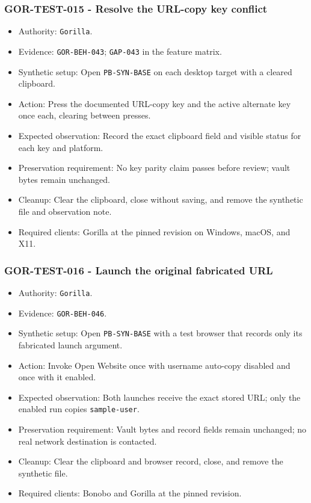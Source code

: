 \documentclass[
  letterpaper,
]{article}
\newcommand{\passthrough}[1]{#1}
\providecommand{\tightlist}{%
  \setlength{\itemsep}{0pt}\setlength{\parskip}{0pt}}
\begin{document}
\subsubsection{GOR-TEST-015 - Resolve the URL-copy key conflict}\label{gor-test-015---resolve-the-url-copy-key-conflict}

\begin{itemize}
\tightlist
\item
  Authority: \passthrough{\lstinline!Gorilla!}.
\item
  Evidence: \nolinkurl{GOR-BEH-043}; \passthrough{\lstinline!GAP-043!} in the feature matrix.
\item
  Synthetic setup: Open \nolinkurl{PB-SYN-BASE} on each desktop target with a cleared clipboard.
\item
  Action: Press the documented URL-copy key and the active alternate key once each, clearing between presses.
\item
  Expected observation: Record the exact clipboard field and visible status for each key and platform.
\item
  Preservation requirement: No key parity claim passes before review; vault bytes remain unchanged.
\item
  Cleanup: Clear the clipboard, close without saving, and remove the synthetic file and observation note.
\item
  Required clients: Gorilla at the pinned revision on Windows, macOS, and X11.
\end{itemize}

\subsubsection{GOR-TEST-016 - Launch the original fabricated
URL}\label{gor-test-016---launch-the-original-fabricated-url}

\begin{itemize}
\tightlist
\item
  Authority: \passthrough{\lstinline!Gorilla!}.
\item
  Evidence: \nolinkurl{GOR-BEH-046}.
\item
  Synthetic setup: Open \nolinkurl{PB-SYN-BASE} with a test browser that records only its fabricated launch argument.
\item
  Action: Invoke Open Website once with username auto-copy disabled and once with it enabled.
\item
  Expected observation: Both launches receive the exact stored URL; only the enabled run copies \nolinkurl{sample-user}.
\item
  Preservation requirement: Vault bytes and record fields remain unchanged; no real network destination is contacted.
\item
  Cleanup: Clear the clipboard and browser record, close, and remove the synthetic file.
\item
  Required clients: Bonobo and Gorilla at the pinned revision.
\end{itemize}
\end{document}
